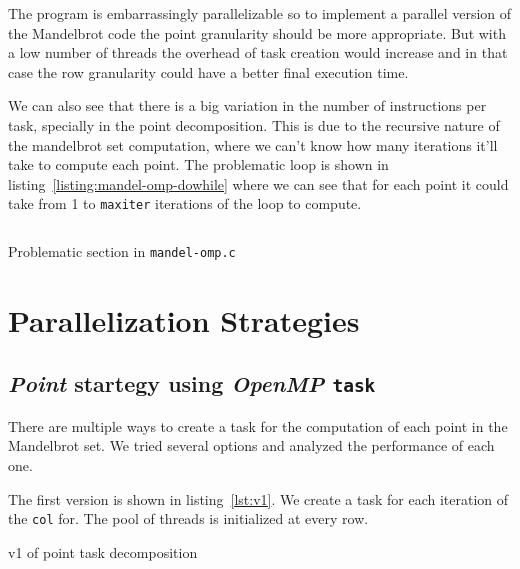 
The program is embarrassingly parallelizable so to implement a parallel version of the Mandelbrot code the point granularity should be more appropriate. But with a low number of threads the overhead of task creation would increase and in that case the row granularity could have a better final execution time.

We can also see that there is a big variation in the number of instructions per task, specially in the point decomposition.
This is due to the recursive nature of the mandelbrot set computation, where we can't know how many iterations it'll
take to compute each point. The problematic loop is shown in listing~\ref{listing:mandel-omp-dowhile} where we can see
that for each point it could take from 1 to \texttt{maxiter} iterations of the loop to compute.

\begin{listing}[H]
\inputminted[firstline=109,lastline=118]{c}{sources/mandel-omp-v1.c}
\caption{Problematic section in \texttt{mandel-omp.c}}
\label{listing:mandel-omp-dowhile}
\end{listing}

\section{Parallelization Strategies}%
\label{sec:Parallelization Strategies}


\subsection{\emph{Point} startegy using \emph{OpenMP} \texttt{task}}%

There are multiple ways to create a task for the computation of each point in the Mandelbrot set. We tried
several options and analyzed the performance of each one.

The first version is shown in listing~\ref{lst:v1}. We create a task for each iteration of the \texttt{col} for. The
pool of threads is initialized at every row.

\begin{listing}[H]
    \caption{v1 of point task decomposition}
    \inputminted[firstline=91,lastline=98]{c}{sources/mandel-omp-v1.c}
    \label{lst:v1} 
\end{listing}

